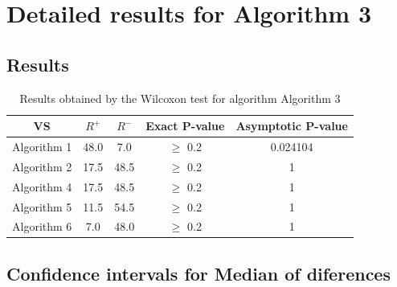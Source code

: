 \documentclass[a4paper,10pt]{article}
\begin{document}
 \clearpage 


\section{Detailed results for Algorithm 3}


\subsection{Results}

\begin{table}[!htp]
\centering\small
\begin{tabular}{
|c|c|c|c|c|}
\hline
 VS & $R^{+}$ & $R^{-}$ & Exact P-value & Asymptotic P-value \\ \hline 
Algorithm 1 & 48.0 & 7.0 & $\geq$ 0.2 & 0.024104\\ \hline 
Algorithm 2 & 17.5 & 48.5 & $\geq$ 0.2 & 1\\ \hline 
Algorithm 4 & 17.5 & 48.5 & $\geq$ 0.2 & 1\\ \hline 
Algorithm 5 & 11.5 & 54.5 & $\geq$ 0.2 & 1\\ \hline 
Algorithm 6 & 7.0 & 48.0 & $\geq$ 0.2 & 1\\ \hline 

\end{tabular}
\caption{Results obtained by the Wilcoxon test for algorithm Algorithm 3}
\end{table}

\subsection{Confidence intervals for Median of diferences}
\end{document}
